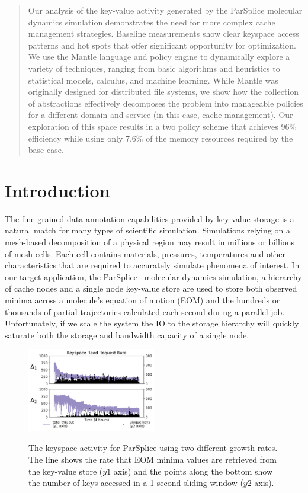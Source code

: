 \begin{abstract}

Our analysis of the key-value activity generated by the ParSplice molecular
dynamics simulation demonstrates the need for more complex cache management
strategies. Baseline measurements show clear keyspace access patterns and hot
spots that offer significant opportunity for optimization. We use the Mantle
language and policy engine to dynamically explore a variety of techniques,
ranging from basic algorithms and heuristics to statistical models, calculus,
and machine learning. While Mantle was originally designed for distributed file
systems, we show how the collection of abstractions effectively decomposes the
problem into manageable policies for a different domain and service (in this
case, cache management).  Our exploration of this space results in a two policy
scheme that achieves 96\% efficiency while using only 7.6\% of the memory
resources required by the base case. 

\end{abstract}

\section{Introduction}

The fine-grained data annotation capabilities provided by key-value storage is
a natural match for many types of scientific simulation. Simulations relying on
a mesh-based decomposition of a physical region may result in millions or
billions of mesh cells. Each cell contains materials, pressures, temperatures
and other characteristics that are required to accurately simulate phenomena of
interest. In our target application, the
ParSplice~\cite{perez:jctc20150parsplice} molecular dynamics simulation, a
hierarchy of cache nodes and a single node key-value store are used to store
both observed minima across a molecule's equation of motion (EOM) and the
hundreds or thousands of partial trajectories calculated each second during a
parallel job. Unfortunately, if we scale the system the IO to the storage
hierarchy will quickly saturate both the storage and bandwidth capacity of a
single node. 

\begin{figure}[t]
  \noindent\includegraphics[width=0.5\textwidth]{figures/motivation-regimes.png}\\
  \caption{The keyspace activity for ParSplice using two different growth
rates.  The line shows the rate that EOM minima values are retrieved from the
key-value store (\(y1\) axis) and the points along the bottom show the number
of keys accessed in a 1 second sliding window (\(y2\) axis).
\label{fig:motivation-regimes}}
\end{figure}

